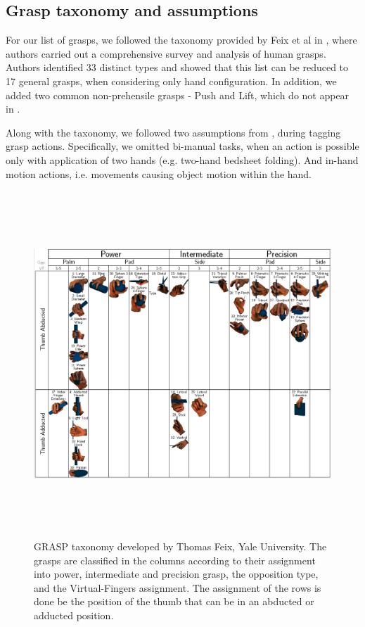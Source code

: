 \documentclass[journal]{IEEEtran}
\begin{document}
\subsection{Grasp taxonomy and assumptions}

For our list of grasps, we followed the taxonomy provided by Feix et al in \cite{IEEEhowto:feix}, where authors carried out a comprehensive survey and analysis of human grasps. Authors identified 33 distinct types and showed that this list can be reduced to 17 general grasps, when considering only hand configuration. In addition, we added two common non-prehensile grasps - Push and Lift, which do not appear in \cite{IEEEhowto:feix}.

Along with the taxonomy, we followed two assumptions from \cite{IEEEhowto:feix}, during tagging grasp actions. Specifically, we omitted bi-manual tasks, when an action is possible only with application of two hands (e.g. two-hand bedsheet folding). And in-hand motion actions, i.e. movements causing object motion within the hand. 


\begin{figure}
\includegraphics[width=\textwidth,height=13cm]{Taxonomy}
\caption{GRASP taxonomy developed by Thomas Feix, Yale University. The grasps are classified in the columns according to their assignment into power,
intermediate and precision grasp, the opposition type, and the Virtual-Fingers assignment. The assignment of the rows is done be the position of the thumb that can be in an
abducted or adducted position.}
\label{fig:taxonomy}
\centering
\end{figure}
\end{document}
